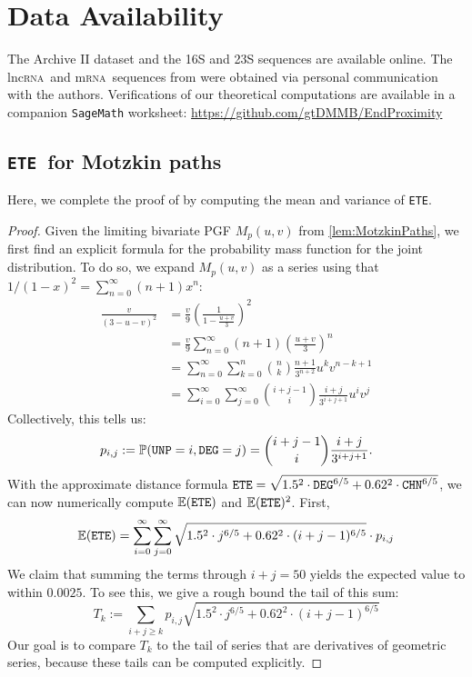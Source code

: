\documentclass{article}
\newcommand{\RNA}{\textsc{rna}}
\newcommand{\DEG}{{\tt DEG}}
\newcommand{\UNP}{{\tt UNP}}
\newcommand{\ETE}{{\tt ETE}}
\newcommand{\COV}{{\tt CHN}}
\begin{document}
\section*{Data Availability} The Archive II dataset \cite{Sloma:2016} and the 16S and 23S sequences \cite{Cannone:2002, Chan:2023} are available online.  The lnc\RNA\ and m\RNA\ sequences from \cite{Lai:2018} were obtained via personal communication with the authors.  Verifications of our theoretical computations are available in a companion {\tt SageMath} worksheet: \url{https://github.com/gtDMMB/EndProximity}

\newpage

\begin{appendices}

\section{\ETE\ for Motzkin paths} \label{sec:MotzkinETE}
Here, we complete the proof of  by computing the mean and variance of \ETE.
\begin{proof}
    Given the limiting bivariate PGF $M_p(u, v)$ from \cref{lem:MotzkinPaths}, we first find an explicit formula for the probability mass function for the joint distribution.  To do so, we expand $M_p(u, v)$ as a series using that $1/(1-x)^2 = \sum_{n = 0}^\infty (n + 1)x^n$:
    \begin{align*}
        \frac{v}{(3-u-v)^2} &= \frac{v}{9} \left(\frac{1}{1 - \frac{u + v}{3}}\right)^2\\
        &= \frac{v}{9} \sum_{n = 0}^\infty (n + 1) \left(\frac{u + v}{3}\right)^n\\
        &= \sum_{n = 0}^\infty \sum_{k = 0}^n \binom{n}{k} \frac{n + 1}{3^{n + 2}} u^k v^{n - k + 1}\\
        &= \sum_{i = 0}^\infty \sum_{j = 0}^\infty \binom{i + j - 1}{i} \frac{i + j}{3^{i + j + 1}} u^i v^j
    \end{align*}
    Collectively, this tells us:
    \[
    p_{i, j} := \mathbb{P}(\UNP = i, \DEG = j) = \binom{i + j - 1}{i} \frac{i + j}{3^{i + j + 1}}.
    \]
    With the approximate distance formula $\ETE = \sqrt{1.5^2 \cdot \DEG^{6/5} + 0.62^2 \cdot \COV^{6/5}}$, we can now numerically compute $\mathbb{E} (\ETE)$ and $\mathbb{E} (\ETE)^2$.  First,
    \begin{equation} \label{eq:ETE-E-Motzkin}
    \mathbb{E}(\ETE) = \sum_{i=0}^\infty \sum_{j=0}^\infty \sqrt{1.5^2 \cdot j^{6/5} + 0.62^2 \cdot (i+j-1)^{6/5}} \cdot p_{i, j}
    \end{equation}
    We claim that summing the terms through $i + j = 50$ yields the expected value to within $0.0025$.  To see this, we give a rough bound the tail of this sum: 
    \[
    T_k := \sum_{i + j \geq k} p_{i, j}\sqrt{1.5^2 \cdot j^{6/5} + 0.62^2 \cdot (i+j-1)^{6/5}}
    \]
    Our goal is to compare $T_k$ to the tail of series that are derivatives of geometric series, because these tails can be computed explicitly.
    

\end{proof}
\end{appendices}
\end{document}
